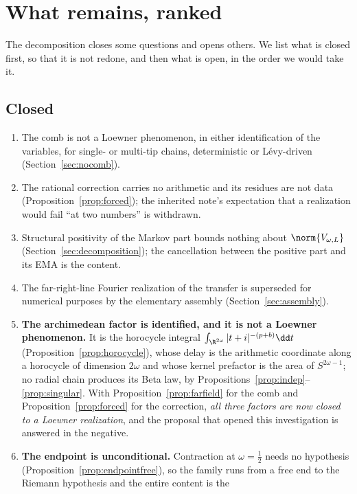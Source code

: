 \section{What remains, ranked}\label{sec:outlook}

The decomposition closes some questions and opens others. We list what is
closed first, so that it is not redone, and then what is open, in the order we
would take it.

\subsection{Closed}

\begin{enumerate}
\item The comb is not a Loewner phenomenon, in either identification of the
variables, for single- or multi-tip chains, deterministic or L\'evy-driven
(Section~\ref{sec:nocomb}).
\item The rational correction carries no arithmetic and its residues are not
data (Proposition~\ref{prop:forced}); the inherited note's expectation that a
realization would fail ``at two numbers'' is withdrawn.
\item Structural positivity of the Markov part bounds nothing about
$\norm{V_{\omega,L}}$ (Section~\ref{sec:decomposition}); the cancellation
between the positive part and its EMA is the content.
\item The far-right-line Fourier realization of the transfer is superseded for
numerical purposes by the elementary assembly (Section~\ref{sec:assembly}).
\item \textbf{The archimedean factor is identified, and it is not a Loewner
phenomenon.} It is the horocycle integral $\int_{\R^{2\omega}}|t+i|^{-(p+b)}\dd t$
(Proposition~\ref{prop:horocycle}), whose delay is the arithmetic coordinate
along a horocycle of dimension $2\omega$ and whose kernel prefactor is the area
of $S^{2\omega-1}$; no radial chain produces its Beta law, by
Propositions~\ref{prop:indep}--\ref{prop:singular}. With
Proposition~\ref{prop:farfield} for the comb and Proposition~\ref{prop:forced}
for the correction, \emph{all three factors are now closed to a Loewner
realization}, and the proposal that opened this investigation is answered in the
negative.
\item \textbf{The endpoint is unconditional.} Contraction at $\omega=\frac12$
needs no hypothesis (Proposition~\ref{prop:endpointfree}), so the family runs
from a free end to the Riemann hypothesis and the entire content is the

\end{enumerate}
